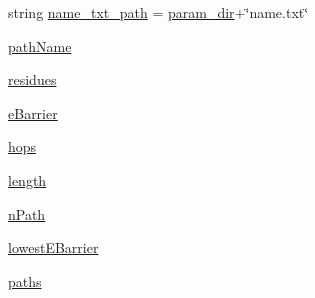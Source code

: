 \begin{DoxyCompactItemize}
\item 
string \hyperlink{namespacehydro__s4_aa46aed89aa2d5d8d4320276c3b510351}{name\-\_\-txt\-\_\-path} = \hyperlink{namespacehydro__s4_a1e650f939d99afbd6f274f51a29f61dd}{param\-\_\-dir}+\char`\"{}name.\-txt\char`\"{}
\item 
\hyperlink{namespacehydro__s4_ad115e94a3500ef38feb39fbbea0286f1}{path\-Name}
\item 
\hyperlink{namespacehydro__s4_a15a9c8fb7e1468e0dbe978cb82ba6438}{residues}
\item 
\hyperlink{namespacehydro__s4_a5dabbf08ce2cc9ec4f3fc0114ee8e56d}{e\-Barrier}
\item 
\hyperlink{namespacehydro__s4_a6c06da400ec3779d670a57a9cf48d4a8}{hops}
\item 
\hyperlink{namespacehydro__s4_abf356e81be21593cde6114d70bc649bc}{length}
\item 
\hyperlink{namespacehydro__s4_aead5430924dc67f871db1928cc25792e}{n\-Path}
\item 
\hyperlink{namespacehydro__s4_aa066e1d9d5c9d3e6b6e995a931f327ba}{lowest\-E\-Barrier}
\item 
\hyperlink{namespacehydro__s4_a48c4d72063bdbc704b1e0aeef019ed96}{paths}
\end{DoxyCompactItemize}


